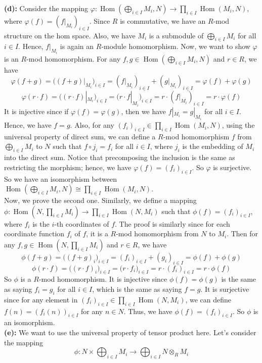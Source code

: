 \documentclass[12pt]{amsart}
\newcommand{\Hom}[0]{\operatorname{Hom}}
\begin{document}
\textbf{(d):} Consider the mapping $\varphi: \Hom(\bigoplus_{i\in I}M_i, N)\to \prod_{i\in I}\Hom(M_i,N)$, where $\varphi(f)=(f|_{M_i})_{i\in I}$. Since $R$ is commutative, we have an $R$-mod structure on the hom space. Also, we have $M_i$ is a submodule of $\bigoplus_{i\in I}M_i$ for all $i\in I$. Hence, $f|_{M_i}$ is again an $R$-module homomorphism. Now, we want to show $\varphi$ is an $R$-mod homomorphism. For any $f,g\in \Hom(\bigoplus_{i\in I}M_i, N)$ and $r\in R$, we have
\[\varphi(f+g)=\Big((f+g)|_{M_i}\Big)_{i\in I}=(f|_{M_i})_{i\in I}+(g|_{M_i})_{i\in I}=\varphi(f)+\varphi(g)\]
\[\varphi(r\cdot f)=\Big((r\cdot f)|_{M_i}\Big)_{i\in I}=\Big(r\cdot f|_{M_i}\Big)_{i\in I}=r\cdot (f|_{M_i})_{i\in I} =r\cdot\varphi(f) \]
It is injective since if $\varphi(f)=\varphi(g)$, then we have $f|_{M_i}=g|_{M_i}$ for all $i\in I$. Hence, we have $f=g$. Also, for any $(f_i)_{i\in I}\in \prod_{i\in I}\Hom(M_i,N)$, using the universal property of direct sum, we can define a $R$-mod homomorphism $f$ from $\bigoplus_{i\in I}M_i$ to $N$ such that $f\circ j_i=f_i$ for all $i\in I$, where $j_i$ is the embedding of $M_i$ into the direct sum. Notice that precomposing the inclusion is the same as restricting the morphism; hence, we have $\varphi(f )=(f_i)_{i\in I}$. So $\varphi$ is surjective. So we have an isomorphism between $\Hom(\bigoplus_{i\in I}M_i, N)\cong \prod_{i\in I}\Hom(M_i,N)$.\\
Now, we prove the second one. Similarly, we define a mapping $\phi: \Hom(N,\prod_{i\in I}M_i)\to \prod_{i\in I}\Hom(N,M_i)$ such that $\phi(f)=(f_i)_{i\in I}$, where $f_i$ is the $i$-th coordinates of $f$. The proof is similarly since for each coordinate function $f_i$ of $f$, it is a $R$-mod homomorphism from $N$ to $M_i$. Then for any $f,g\in \Hom(N,\prod_{i\in I}M_i)$ and $r\in R$, we have
\[\phi(f+g)=\Big((f+g)_i\Big)_{i\in I}=(f_i)_{i\in I}+(g_i)_{i\in I}=\phi(f)+\phi(g)\]
\[\phi(r\cdot f)=\Big((r\cdot f)_i\Big)_{i\in I}=\Big(r\cdot f_i\Big)_{i\in I}=r\cdot (f_i)_{i\in I} =r\cdot\phi(f) \]
So $\phi$ is a $R$-mod homomorphism. It is injective since $\phi(f)=\phi(g)$ is the same as saying $f_i=g_i$ for all $i\in I$, which is the same as saying $f=g$. It is surjective since for any element in $(f_i)_{i\in I}\in \prod_{i\in I}\Hom(N,M_i)$, we can define $f(n)=(f_i(n))_{i\in I}$ for any $n\in N$. Thus, we have $\phi(f)=(f_i)_{i\in I}$. So $\phi$ is an isomorphism.
\\\textbf{(e):} We want to use the universal property of tensor product here. Let's consider the mapping
\[\phi: N\times \bigoplus_{i\in I} M_i\to \bigoplus_{i\in I} N\otimes_R M_i\]
\end{document}
